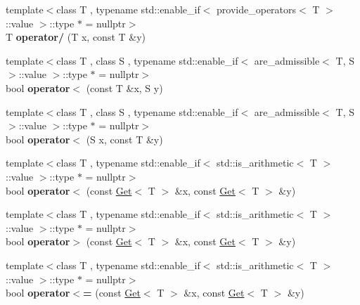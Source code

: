 \begin{DoxyCompactItemize}
\item 
{\footnotesize template$<$class T , typename std\+::enable\+\_\+if$<$ provide\+\_\+operators$<$ T $>$\+::value $>$\+::type $\ast$  = nullptr$>$ }\\T {\bfseries operator/} (T x, const T \&y)\hypertarget{namespaceSpacy_1_1Mixin_a0c8ac4ed8b1a63bbe8ad222064f675c9}{}\label{namespaceSpacy_1_1Mixin_a0c8ac4ed8b1a63bbe8ad222064f675c9}

\item 
{\footnotesize template$<$class T , class S , typename std\+::enable\+\_\+if$<$ are\+\_\+admissible$<$ T, S $>$\+::value $>$\+::type $\ast$  = nullptr$>$ }\\bool {\bfseries operator$<$} (const T \&x, S y)\hypertarget{namespaceSpacy_1_1Mixin_abaed17ac03b210fcb81ada163cbd6ac9}{}\label{namespaceSpacy_1_1Mixin_abaed17ac03b210fcb81ada163cbd6ac9}

\item 
{\footnotesize template$<$class T , class S , typename std\+::enable\+\_\+if$<$ are\+\_\+admissible$<$ T, S $>$\+::value $>$\+::type $\ast$  = nullptr$>$ }\\bool {\bfseries operator$<$} (S x, const T \&y)\hypertarget{namespaceSpacy_1_1Mixin_a00b6bcab3cc27de1422a4c578a0d14ed}{}\label{namespaceSpacy_1_1Mixin_a00b6bcab3cc27de1422a4c578a0d14ed}

\item 
{\footnotesize template$<$class T , typename std\+::enable\+\_\+if$<$ std\+::is\+\_\+arithmetic$<$ T $>$\+::value $>$\+::type $\ast$  = nullptr$>$ }\\bool {\bfseries operator$<$} (const \hyperlink{classSpacy_1_1Mixin_1_1Get}{Get}$<$ T $>$ \&x, const \hyperlink{classSpacy_1_1Mixin_1_1Get}{Get}$<$ T $>$ \&y)\hypertarget{namespaceSpacy_1_1Mixin_abc3b2e9db7dc8319ff9a435dfb97dec7}{}\label{namespaceSpacy_1_1Mixin_abc3b2e9db7dc8319ff9a435dfb97dec7}

\item 
{\footnotesize template$<$class T , typename std\+::enable\+\_\+if$<$ std\+::is\+\_\+arithmetic$<$ T $>$\+::value $>$\+::type $\ast$  = nullptr$>$ }\\bool {\bfseries operator$>$} (const \hyperlink{classSpacy_1_1Mixin_1_1Get}{Get}$<$ T $>$ \&x, const \hyperlink{classSpacy_1_1Mixin_1_1Get}{Get}$<$ T $>$ \&y)\hypertarget{namespaceSpacy_1_1Mixin_a13fe285ef51594645d4a96734b893654}{}\label{namespaceSpacy_1_1Mixin_a13fe285ef51594645d4a96734b893654}

\item 
{\footnotesize template$<$class T , typename std\+::enable\+\_\+if$<$ std\+::is\+\_\+arithmetic$<$ T $>$\+::value $>$\+::type $\ast$  = nullptr$>$ }\\bool {\bfseries operator$<$=} (const \hyperlink{classSpacy_1_1Mixin_1_1Get}{Get}$<$ T $>$ \&x, const \hyperlink{classSpacy_1_1Mixin_1_1Get}{Get}$<$ T $>$ \&y)\hypertarget{namespaceSpacy_1_1Mixin_a65b966bf02c25acb637530347f5cd838}{}\label{namespaceSpacy_1_1Mixin_a65b966bf02c25acb637530347f5cd838}


\end{DoxyCompactItemize}
